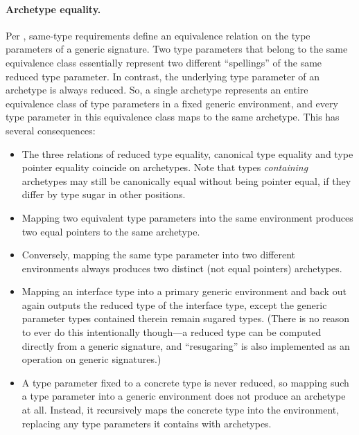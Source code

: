 \documentclass[../generics]{subfiles}
\begin{document}
\paragraph{Archetype equality.} Per , same-type requirements define an equivalence relation on the type parameters of a generic signature. Two type parameters that belong to the same equivalence class essentially represent two different ``spellings'' of the same reduced type parameter. In contrast, the underlying type parameter of an archetype is always reduced. So, a single archetype represents an entire equivalence class of type parameters in a fixed generic environment, and every type parameter in this equivalence class maps to the same archetype. This has several consequences:
\begin{itemize}
\item The three relations of reduced type equality, canonical type equality and type pointer equality coincide on archetypes. Note that types \emph{containing} archetypes may still be canonically equal without being pointer equal, if they differ by type sugar in other positions.

\item Mapping two equivalent type parameters into the same environment produces two equal pointers to the same archetype.

\item Conversely, mapping the same type parameter into two different environments always produces two distinct (not equal pointers) archetypes.

\item Mapping an interface type into a primary generic environment and back out again outputs the reduced type of the interface type, except the generic parameter types contained therein remain sugared types. (There is no reason to ever do this intentionally though---a reduced type can be computed directly from a generic signature, and ``resugaring'' is also implemented as an operation on generic signatures.)

\item A type parameter fixed to a concrete type is never reduced, so mapping such a type parameter into a generic environment does not produce an archetype at all. Instead, it recursively maps the concrete type into the environment, replacing any type parameters it contains with archetypes.
\end{itemize}
\end{document}
